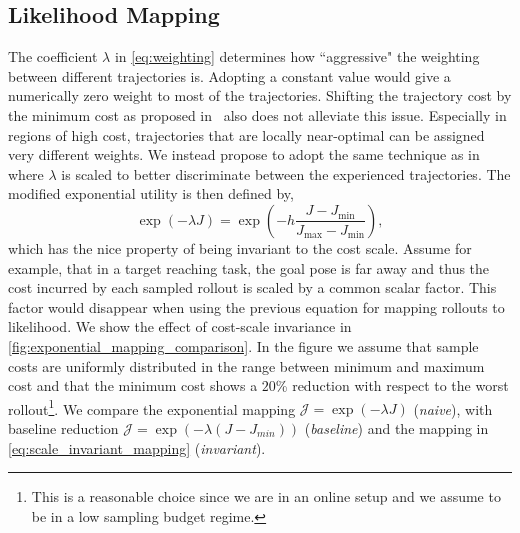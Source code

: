 \subsection{Likelihood Mapping} 
The coefficient $\lambda$ in \eqref{eq:weighting} determines how ``aggressive" the weighting between different trajectories is. Adopting a constant value would give a numerically zero weight to most of the trajectories. Shifting the trajectory cost by the minimum cost as proposed in~\cite{williams_information_2017} also does not alleviate this issue. 
Especially in regions of high cost, trajectories that are locally near-optimal can be assigned very different weights. We instead propose to adopt the same technique as in~\cite{theodorou2010generalized} where $\lambda$ is scaled to better discriminate between the experienced trajectories. The modified exponential utility is then defined by,
\begin{equation} \label{eq:scale_invariant_mapping}
    \exp (-\lambda J ) = \exp \left( -h \frac{J - J_{\min}}{J_{\max} - J_{\min}} \right),
\end{equation}
which has the nice property of being invariant to the cost scale. Assume for example, that in a target reaching task, the goal pose is far away and thus the cost incurred by each sampled rollout is scaled by a common scalar factor. This factor would disappear when using the previous equation for mapping rollouts to likelihood. We show the effect of cost-scale invariance in \fig \ref{fig:exponential_mapping_comparison}. In the figure we assume that sample costs are uniformly distributed in the range between minimum and maximum cost and that the minimum cost shows a $20$\% reduction with respect to the worst rollout\footnote{This is a reasonable choice since we are in an online setup and we assume to be in a low sampling budget regime.}. We compare the exponential mapping $\mathcal{J} = \exp(-\lambda J)$ (\textit{naive}), with baseline reduction $\mathcal{J} = \exp(-\lambda (J - J_{min}))$ (\textit{baseline}) and the mapping in \eqref{eq:scale_invariant_mapping} (\textit{invariant}).

